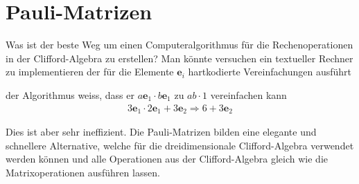 %
%
%
\section{Pauli-Matrizen}

Was ist der beste Weg um einen Computeralgorithmus für die Rechenoperationen in der Clifford-Algebra zu erstellen? Man könnte versuchen ein textueller Rechner zu implementieren der für die Elemente $\mathbf{e}_i$ hartkodierte Vereinfachungen ausführt 
\begin{beispiel}
	der Algorithmus weiss, dass er $a\mathbf{e}_1\cdot b\mathbf{e}_1$ zu $ab\cdot1$ vereinfachen kann
	\begin{align}
		3\mathbf{e}_1 \cdot 2\mathbf{e}_1 + 3\mathbf{e}_2 \Rightarrow 6 + 3\mathbf{e}_2
	\end{align}
\end{beispiel}
Dies ist aber sehr ineffizient. Die Pauli-Matrizen bilden eine elegante und schnellere Alternative, welche für die dreidimensionale Clifford-Algebra verwendet werden können und alle Operationen aus der Clifford-Algebra gleich wie die Matrixoperationen ausführen lassen.
